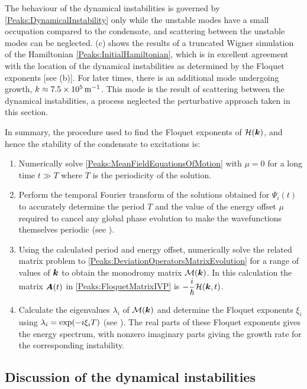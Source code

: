 The behaviour of the dynamical instabilities is governed by \eqref{Peaks:DynamicalInstability} only while the unstable modes have a small occupation compared to the condensate, and scattering between the unstable modes can be neglected. (c) shows the results of a truncated Wigner simulation of the Hamiltonian \eqref{Peaks:InitialHamiltonian}, which is in excellent agreement with the location of the dynamical instabilities as determined by the Floquet exponents [see (b)]. For later times, there is an additional mode undergoing growth, $k \approx \unit[7.5\times 10^5]{m}^{-1}$. This mode is the result of scattering between the dynamical instabilities, a process neglected the perturbative approach taken in this section. 

\parasep

In summary, the procedure used to find the Floquet exponents of $\mathcal{H}(\bm{k})$, and hence the stability of the condensate to excitations is:
\begin{enumerate}
    \item Numerically solve \eqref{Peaks:MeanFieldEquationsOfMotion} with $\mu=0$ for a long time $t \gg T$ where $T$ is the periodicity of the solution.
    \item Perform the temporal Fourier transform of the solutions obtained for $\Psi_i(t)$ to accurately determine the period $T$ and the value of the energy offset $\mu$ required to cancel any global phase evolution to make the wavefunctions themselves periodic (see ).
    \item Using the calculated period and energy offset, numerically solve the related matrix problem to \eqref{Peaks:DeviationOperatorsMatrixEvolution} for a range of values of $\bm{k}$ to obtain the monodromy matrix $\mathcal{M}(\bm{k})$. In this calculation the matrix $\bm{A}(t)$ in \eqref{Peaks:FloquetMatrixIVP} is $\displaystyle -\frac{i}{\hbar}\mathcal{H}(\bm{k}, t)$.
    \item Calculate the eigenvalues $\lambda_i$ of $\mathcal{M}(\bm{k})$ and determine the Floquet exponents $\xi_i$ using $\protect{\lambda_i = \exp(-i \xi_i T)}$ (see ). The real parts of these Floquet exponents gives the energy spectrum, with nonzero imaginary parts giving the growth rate for the corresponding instability.
\end{enumerate}

\subsection{Discussion of the dynamical instabilities}
\label{Peaks:DynamicalInstabilitiesDiscussion}

